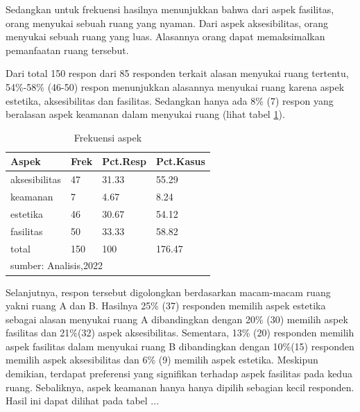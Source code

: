 \documentclass[11pt]{udthesis} %
\begin{document}
Sedangkan untuk frekuensi hasilnya menunjukkan bahwa dari aspek fasilitas, orang menyukai sebuah ruang yang nyaman. Dari aspek aksesibilitas, orang menyukai sebuah ruang yang luas. Alasannya orang dapat memaksimalkan pemanfaatan ruang tersebut.

Dari total 150 respon dari 85 responden terkait alasan menyukai ruang tertentu, 54\%-58\% (46-50) respon menunjukkan alasannya menyukai ruang karena aspek estetika, aksesibilitas dan fasilitas. Sedangkan hanya ada 8\% (7) respon yang beralasan aspek keamanan dalam menyukai ruang (lihat tabel \ref{tab:mrpaF}).

\begin{table}[ht]
\centering
\caption{Frekuensi aspek} 
\label{tab:mrpaF}
\begin{tabular}{llll}
  \toprule
Aspek & Frek & Pct.Resp & Pct.Kasus \\ 
  \midrule
aksesibilitas & 47 & 31.33 & 55.29 \\ 
  keamanan & 7 & 4.67 & 8.24 \\ 
  estetika & 46 & 30.67 & 54.12 \\ 
  fasilitas & 50 & 33.33 & 58.82 \\ 
  total & 150 & 100 & 176.47 \\ 
   \hline 
 \multicolumn{4}{l}{\scriptsize{sumber: Analisis,2022 }} \\
\end{tabular}
\end{table}

Selanjutnya, respon tersebut digolongkan berdasarkan macam-macam ruang yakni ruang A dan B. Hasilnya 25\% (37) responden memilih aspek estetika sebagai alasan menyukai ruang A dibandingkan dengan 20\% (30) memilih aspek fasilitas dan 21\%(32) aspek aksesibilitas. Sementara, 13\% (20) responden memilih aspek fasilitas dalam menyukai ruang B dibandingkan dengan 10\%(15) responden memilih aspek aksesibilitas dan 6\% (9) memilih aspek estetika. Meskipun demikian, terdapat preferensi yang signifikan terhadap aspek fasilitas pada kedua ruang. Sebaliknya, aspek keamanan hanya hanya dipilih sebagian kecil responden. Hasil ini dapat dilihat pada tabel ...
\end{document}
